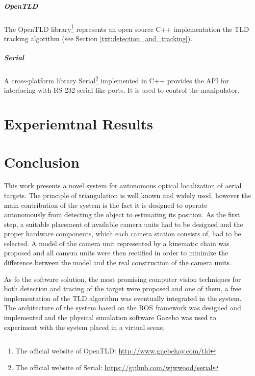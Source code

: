 \paragraph{OpenTLD} The OpenTLD library\footnote{The official website of OpenTLD: \url{http://www.gnebehay.com/tld}} represents an open source C++ implementation the TLD tracking algorithm (see Section \ref{txt:detection_and_tracking}).	

\paragraph{Serial} A cross-platform library Serial\footnote{The official website of Serial: \url{https://github.com/wjwwood/serial}} implemented in C++ provides the API for interfacing with RS-232 serial like ports. It is used to control the manipulator.

\chapter{Experiemtnal Results}

\vata[28]

\chapter{Conclusion} \label{txt:conclusion}

This work presents a novel system for autonomous optical localization of aerial targets. The principle of triangulation is well known and widely used, however the main contribution of the system is the fact it is designed to operate autonomously from detecting the object to estimating its position. As the first step, a suitable placement of available camera units had to be designed and the proper hardware components, which each camera station consists of, had to be selected. A model of the camera unit represented by a kinematic chain was proposed and all camera units were then rectified in order to minimize the difference between the model and the real construction of the camera units.

As fo the software solution, the most promising computer vision techniques for both detection and tracing of the target were proposed and one of them, a free implementation of the TLD algorithm was eventually integrated in the system. The architecture of the system based on the ROS framework was designed and implemented and the physical simulation software Gazebo was used to experiment with the system placed in a virtual scene.

